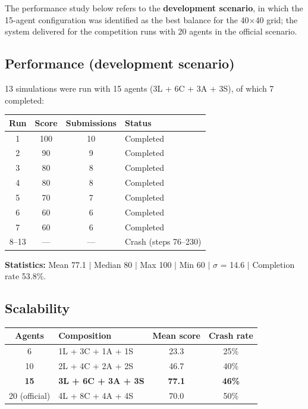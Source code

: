 \documentclass[11pt,a4paper]{article}
\begin{document}
The performance study below refers to the \textbf{development scenario}, in which the 15-agent configuration was identified as the best balance for the 40$\times$40 grid; the system delivered for the competition runs with 20 agents in the official scenario.

\subsection{Performance (development scenario)}
13 simulations were run with 15 agents (3L + 6C + 3A + 3S), of which 7 completed:

\begin{table}[H]
\centering
\begin{tabularx}{\linewidth}{c c c X}
\toprule
\textbf{Run} & \textbf{Score} & \textbf{Submissions} & \textbf{Status} \\
\midrule
1 & 100 & 10 & Completed \\
2 & 90 & 9 & Completed \\
3 & 80 & 8 & Completed \\
4 & 80 & 8 & Completed \\
5 & 70 & 7 & Completed \\
6 & 60 & 6 & Completed \\
7 & 60 & 6 & Completed \\
8--13 & --- & --- & Crash (steps 76--230) \\
\bottomrule
\end{tabularx}
\end{table}

\noindent\textbf{Statistics:} Mean 77.1 $\mid$ Median 80 $\mid$ Max 100 $\mid$ Min 60 $\mid$ $\sigma$ = 14.6 $\mid$ Completion rate 53.8\%.

\subsection{Scalability}
\begin{table}[H]
\centering
\begin{tabularx}{\linewidth}{c X c c}
\toprule
\textbf{Agents} & \textbf{Composition} & \textbf{Mean score} & \textbf{Crash rate} \\
\midrule
6 & 1L + 3C + 1A + 1S & 23.3 & 25\% \\
10 & 2L + 4C + 2A + 2S & 46.7 & 40\% \\
\textbf{15} & \textbf{3L + 6C + 3A + 3S} & \textbf{77.1} & \textbf{46\%} \\
20 (official) & 4L + 8C + 4A + 4S & 70.0 & 50\% \\
\bottomrule
\end{tabularx}
\end{table}
\end{document}
